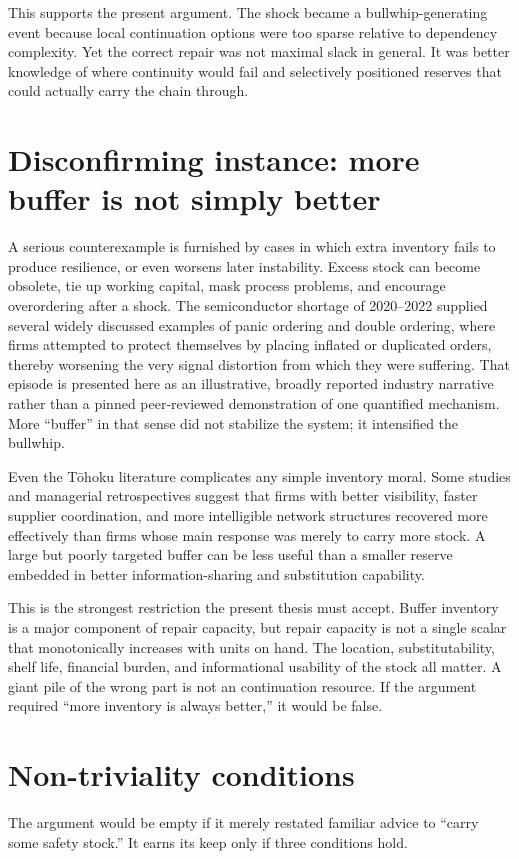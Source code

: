 \documentclass[11pt]{article}
\begin{document}
This supports the present argument. The shock became a bullwhip-generating event because local continuation options were too sparse relative to dependency complexity. Yet the correct repair was not maximal slack in general. It was better knowledge of where continuity would fail and selectively positioned reserves that could actually carry the chain through.

\section{Disconfirming instance: more buffer is not simply better}
A serious counterexample is furnished by cases in which extra inventory fails to produce resilience, or even worsens later instability. Excess stock can become obsolete, tie up working capital, mask process problems, and encourage overordering after a shock. The semiconductor shortage of 2020--2022 supplied several widely discussed examples of panic ordering and double ordering, where firms attempted to protect themselves by placing inflated or duplicated orders, thereby worsening the very signal distortion from which they were suffering. That episode is presented here as an illustrative, broadly reported industry narrative rather than a pinned peer-reviewed demonstration of one quantified mechanism. More ``buffer'' in that sense did not stabilize the system; it intensified the bullwhip.

Even the T\=ohoku literature complicates any simple inventory moral. Some studies and managerial retrospectives suggest that firms with better visibility, faster supplier coordination, and more intelligible network structures recovered more effectively than firms whose main response was merely to carry more stock. A large but poorly targeted buffer can be less useful than a smaller reserve embedded in better information-sharing and substitution capability.

This is the strongest restriction the present thesis must accept. Buffer inventory is a major component of repair capacity, but repair capacity is not a single scalar that monotonically increases with units on hand. The location, substitutability, shelf life, financial burden, and informational usability of the stock all matter. A giant pile of the wrong part is not an \admissible continuation resource. If the argument required ``more inventory is always better,'' it would be false.

\section{Non-triviality conditions}
The argument would be empty if it merely restated familiar advice to ``carry some safety stock.'' It earns its keep only if three conditions hold.
\end{document}
